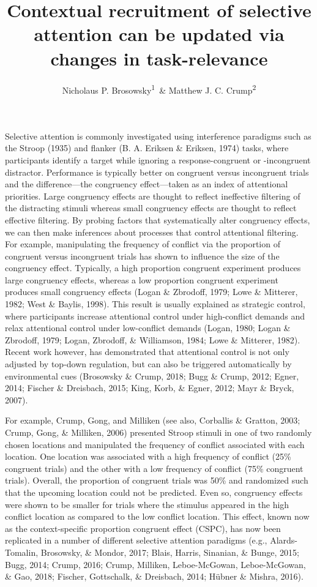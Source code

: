 \documentclass[english,,man,floatsintext]{apa6}
\title{Contextual recruitment of selective attention can be updated via changes
in task-relevance}
\author{Nicholaus P. Brosowsky\textsuperscript{1}~\& Matthew J. C.
Crump\textsuperscript{2}}
\date{}
\affiliation{
\vspace{0.5cm}
\textsuperscript{1} The Graduate Center of the City University of New York\\\textsuperscript{2} Brooklyn College of the City University of New York}
\begin{document}
\maketitle

Selective attention is commonly investigated using interference
paradigms such as the Stroop (1935) and flanker (B. A. Eriksen \&
Eriksen, 1974) tasks, where participants identify a target while
ignoring a response-congruent or -incongruent distractor. Performance is
typically better on congruent versus incongruent trials and the
difference---the congruency effect---taken as an index of attentional
priorities. Large congruency effects are thought to reflect ineffective
filtering of the distracting stimuli whereas small congruency effects
are thought to reflect effective filtering. By probing factors that
systematically alter congruency effects, we can then make inferences
about processes that control attentional filtering. For example,
manipulating the frequency of conflict via the proportion of congruent
versus incongruent trials has shown to influence the size of the
congruency effect. Typically, a high proportion congruent experiment
produces large congruency effects, whereas a low proportion congruent
experiment produces small congruency effects (Logan \& Zbrodoff, 1979;
Lowe \& Mitterer, 1982; West \& Baylis, 1998). This result is usually
explained as strategic control, where participants increase attentional
control under high-conflict demands and relax attentional control under
low-conflict demands (Logan, 1980; Logan \& Zbrodoff, 1979; Logan,
Zbrodoff, \& Williamson, 1984; Lowe \& Mitterer, 1982). Recent work
however, has demonstrated that attentional control is not only adjusted
by top-down regulation, but can also be triggered automatically by
environmental cues (Brosowsky \& Crump, 2018; Bugg \& Crump, 2012;
Egner, 2014; Fischer \& Dreisbach, 2015; King, Korb, \& Egner, 2012;
Mayr \& Bryck, 2007).

For example, Crump, Gong, and Milliken (see also, Corballis \& Gratton,
2003; Crump, Gong, \& Milliken, 2006) presented Stroop stimuli in one of
two randomly chosen locations and manipulated the frequency of conflict
associated with each location. One location was associated with a high
frequency of conflict (25\% congruent trials) and the other with a low
frequency of conflict (75\% congruent trials). Overall, the proportion
of congruent trials was 50\% and randomized such that the upcoming
location could not be predicted. Even so, congruency effects were shown
to be smaller for trials where the stimulus appeared in the high
conflict location as compared to the low conflict location. This effect,
known now as the context-specific proportion congruent effect (CSPC),
has now been replicated in a number of different selective attention
paradigms (e.g., Alards-Tomalin, Brosowsky, \& Mondor, 2017; Blais,
Harris, Sinanian, \& Bunge, 2015; Bugg, 2014; Crump, 2016; Crump,
Milliken, Leboe-McGowan, Leboe-McGowan, \& Gao, 2018; Fischer,
Gottschalk, \& Dreisbach, 2014; Hübner \& Mishra, 2016).
\end{document}
